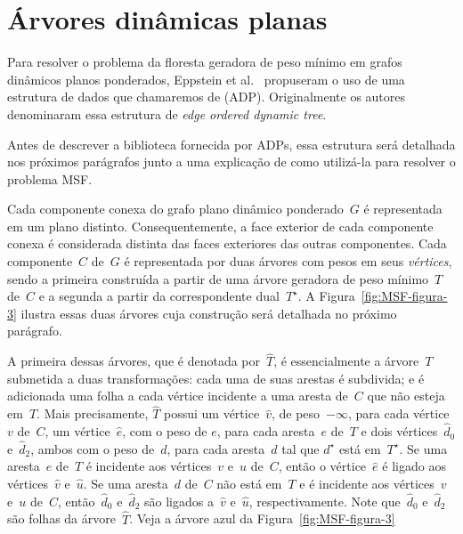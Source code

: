 \section{Árvores dinâmicas planas}
\label{sec:MSFcomADP}

Para resolver o problema da floresta geradora de peso mínimo em grafos dinâmicos planos ponderados, Eppstein et al.~\cite{EPPSTEIN-planar} propuseram o uso de uma estrutura de dados que chamaremos de  (ADP). Originalmente os autores denominaram essa estrutura de \textit{edge ordered dynamic tree}.



Antes de descrever a biblioteca fornecida por ADPs, essa estrutura será detalhada nos próximos parágrafos junto a uma explicação de como utilizá-la para resolver o problema MSF.

Cada componente conexa do grafo plano dinâmico ponderado~$G$ é representada em um plano distinto.
Consequentemente, a face exterior de cada componente conexa é considerada distinta das faces exteriores das outras componentes.
Cada componente~$C$ de~$G$ é representada por duas árvores com pesos em seus \textit{vértices}, sendo a primeira construída a partir de uma árvore geradora de peso mínimo~$T$ de~$C$ e a segunda a partir da correspondente dual~$T^\star$.
A Figura~\ref{fig:MSF-figura-3} ilustra essas duas árvores cuja construção será detalhada no próximo parágrafo.

A primeira dessas árvores, que é denotada por~$\hat T$, é essencialmente a árvore~$T$ submetida a duas transformações:
cada uma de suas arestas é subdivida; e é adicionada uma folha a cada vértice incidente a uma aresta de~$C$ que não esteja em~$T$.
Mais precisamente, $\hat T$ possui um vértice~$\hat v$, de peso~$-\infty$, para cada vértice~$v$ de~$C$, um vértice~$\hat e$, com o peso de $e$, para cada aresta~$e$ de~$T$ e dois vértices~$\hat d_0$ e~$\hat d_2$, ambos com o peso de~$d$, para cada aresta~$d$ tal que $d^\star$ está em~$T^\star$.
Se uma aresta~$e$ de~$T$ é incidente aos vértices~$v$ e~$u$ de~$C$, então o vértice~$\hat e$ é ligado aos vértices~$\hat v$ e~$\hat u$.
Se uma aresta~$d$ de~$C$ não está em~$T$ e é incidente aos vértices~$v$ e~$u$ de~$C$, então~$\hat d_0$ e~$\hat d_2$ são ligados a~$\hat v$ e~$\hat u$, respectivamente.
Note que~$\hat d_0$ e~$\hat d_2$ são folhas da árvore~$\hat T$.
Veja a árvore azul da Figura~\ref{fig:MSF-figura-3} 

